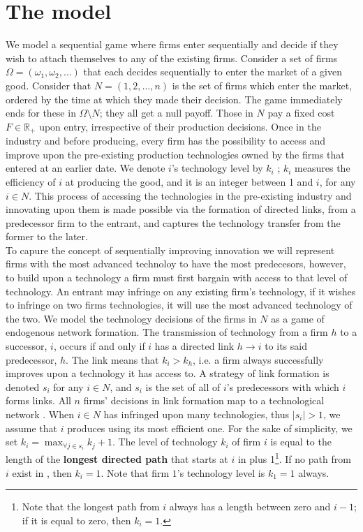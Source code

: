 \documentclass{article}
\begin{document}
\section{The model}
\indent We model a sequential game where firms enter sequentially and decide if they wish to attach themselves to any of the existing firms. Consider a set of firms $\Omega=(\omega_1,\omega_2,\ldots)$ that each decides sequentially to enter the market of a given good. Consider that $N=(1,2,\ldots,n)$ is the set of firms which enter the market, ordered by the time at which they made their decision. The game immediately ends for these in $\Omega\setminus N$; they all get a null payoff. Those in $N$ pay a fixed cost $F\in \mathbb{R}_+$ upon entry, irrespective of their production decisions. Once in the industry and before producing, every firm has the possibility to access and improve upon the pre-existing production technologies owned by the firms that entered at an earlier date. We denote $i$'s technology level by $k_i$ ; $k_i$ measures the efficiency of $i$ at producing the good, and it is an integer between 1 and $i$, for any $i\in N$. This process of accessing the technologies in the pre-existing industry and innovating upon them is made possible via the formation of directed links, from a predecessor firm to the entrant, and captures the technology transfer from the former to the later. \\
\indent To capure the concept of sequentially improving innovation we will represent firms with the most advanced technoloy to have the most predecesors, however, to build upon a technology a firm must first bargain with access to that level of technology. An entrant may infringe on any existing firm's technology, if it wishes to infringe on two firms technologies, it will use the most advanced technology of the two. We model the technology decisions of the firms in $N$ as a game of endogenous network formation. The transmission of technology from a firm $h$ to a successor, $i$, occurs if and only if $i$ has a directed link $h\rightarrow i$ to its said predecessor, $h$. The link means that $k_i>k_h$, i.e. a firm always successfully improves upon a technology it has access to. A strategy of link formation is denoted $s_i$ for any $i\in N$, and $s_i$ is the set of all of $i$'s predecessors with which $i$ forms links. All $n$ firms' decisions in link formation map to a technological network . When $i\in N$ has infringed upon many technologies, thus $|s_i|>1$, we assume that $i$ produces using its most efficient one. For the sake of simplicity, we set $k_i=\max_{\forall j\in s_i} k_j+1$. The level of technology $k_i$ of firm $i$ is equal to the length of the \textbf{longest directed path} that starts at $i$ in  plus 1\footnote{Note that the longest path from $i$ always has a length between zero and $i-1$; if it is equal to zero, then $k_i=1$.}. If no path from $i$ exist in , then $k_i=1$. Note that firm $1$'s technology level is $k_1=1$ always. \\
\end{document}
